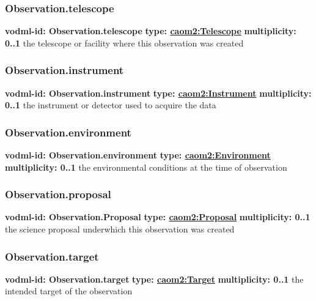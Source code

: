     \subsubsection{Observation.telescope}
      \textbf{vodml-id: Observation.telescope} \newline
      \textbf{type: \hyperref[sect:Telescope]{caom2:Telescope}} \newline
      \textbf{multiplicity: 0..1} \newline
      the telescope or facility where this observation was created

    \subsubsection{Observation.instrument}
      \textbf{vodml-id: Observation.instrument} \newline
      \textbf{type: \hyperref[sect:Instrument]{caom2:Instrument}} \newline
      \textbf{multiplicity: 0..1} \newline
      the instrument or detector used to acquire the data

    \subsubsection{Observation.environment}
      \textbf{vodml-id: Observation.environment} \newline
      \textbf{type: \hyperref[sect:Environment]{caom2:Environment}} \newline
      \textbf{multiplicity: 0..1} \newline
      the environmental conditions at the time of observation

    \subsubsection{Observation.proposal}
      \textbf{vodml-id: Observation.Proposal} \newline
      \textbf{type: \hyperref[sect:Proposal]{caom2:Proposal}} \newline
      \textbf{multiplicity: 0..1} \newline
      the science proposal underwhich this observation was created

    \subsubsection{Observation.target}
      \textbf{vodml-id: Observation.target} \newline
      \textbf{type: \hyperref[sect:Target]{caom2:Target}} \newline
      \textbf{multiplicity: 0..1} \newline
      the intended target of the observation

